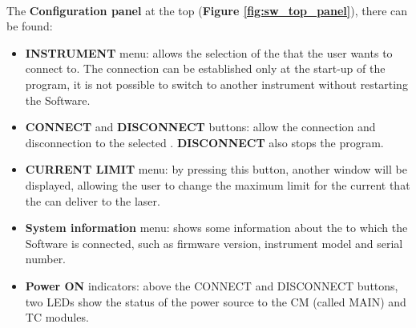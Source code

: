 \paragraph{} The \textbf{Configuration panel} at the top (\textbf{Figure \ref{fig:sw_top_panel}}), there can be found:
    \begin{itemize}
        \item \textbf{INSTRUMENT} menu: allows the selection of the \QubeModel  that the user wants to connect to. The connection can be established only at the start-up of the program, it is not possible to switch to another \QubeModel  instrument without restarting the \SoftwareType Software.
        \item \textbf{CONNECT} and \textbf{DISCONNECT} buttons: allow the connection and disconnection to the selected \QubeModel . \textbf{DISCONNECT} also stops the program.
        \item \textbf{CURRENT LIMIT} menu: by pressing this button, another window will be displayed, allowing the user to change the maximum limit for the current that the \QubeModel  can deliver to the laser.
        \item \textbf{System information} menu: shows some information about the \QubeModel  to which the \SoftwareType Software is connected, such as firmware version, instrument model and serial number.
        \item \textbf{Power ON} indicators: above the CONNECT and DISCONNECT buttons, two LEDs show the status of the power source to the CM (called MAIN) and TC modules.
    \end{itemize}

